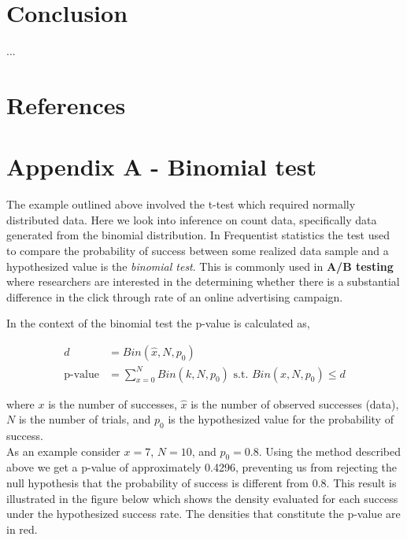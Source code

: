 \documentclass[12pt]{article}
\begin{document}
\section{Conclusion}

\noindent ...

\pagebreak
\section{References}

\pagebreak
\section{Appendix A - Binomial test}

The example outlined above involved the t-test which required normally distributed data. Here we look into inference on count data, specifically data generated from the binomial distribution. In Frequentist statistics the test used to compare the probability of success between some realized data sample and a hypothesized value is the \emph{binomial test}. This is commonly used in \textbf{A/B testing} where researchers are interested in the determining whether there is a substantial difference in the click through rate of an online advertising campaign.

In the context of the binomial test the p-value is calculated as,

\begin{align*}
d &= Bin(\hat{x}, N, p_0) \\
\mbox{p-value} &= \sum_{x=0}^{N}Bin(k, N, p_0) \mbox{ s.t. } Bin(x, N, p_0) \leq d
\end{align*}

\noindent where $x$ is the number of successes, $\hat{x}$ is the number of observed successes (data), $N$ is the number of trials, and $p_0$ is the hypothesized value for the probability of success. \\

\noindent As an example consider $x = 7$, $N = 10$, and $p_0 = 0.8$. Using the method described above we get a p-value of approximately 0.4296, preventing us from rejecting the null hypothesis that the probability of success is different from 0.8. This result is illustrated in the figure below which shows the density evaluated for each success under the hypothesized success rate. The densities that constitute the p-value are in red.
\end{document}
